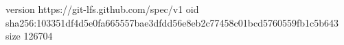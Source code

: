 version https://git-lfs.github.com/spec/v1
oid sha256:103351df4d5e0fa665557bae3dfdd56e8eb2c77458c01bcd5760559fb1c5b643
size 126704
